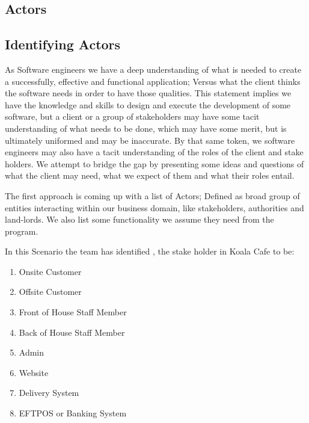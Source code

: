 \documentclass{article}
\begin{document}
\subsection{Actors}
\subsection{Identifying Actors}

As Software engineers we have a deep understanding of what is needed to create a successfully, effective and functional application; Versus what the client thinks the software needs in order to have those qualities. This statement implies we have the knowledge and skills to design and execute the development of some software, but a client or a group of stakeholders may have some tacit understanding of what needs to be done, which may have some merit, but is ultimately uniformed and may be inaccurate. By that same token, we software engineers may also have a tacit understanding of the roles of the client and stake holders. We attempt to bridge the gap by presenting some ideas and questions of what the client may need, what we expect of them and what their roles entail. 

The first approach is coming up with a list of Actors; Defined as broad group of entities interacting within our business domain, like stakeholders, authorities and land-lords. We also list some functionality we assume they need from the program.

In this Scenario the team has identified , the stake holder in Koala Cafe to be:


\begin{enumerate}
    \item Onsite Customer
    \item Offsite Customer
    \item Front of House Staff Member
    \item Back of House Staff Member
    \item Admin
    \item Website
    \item Delivery System
    \item EFTPOS or Banking System
\end{enumerate}
\end{document}
